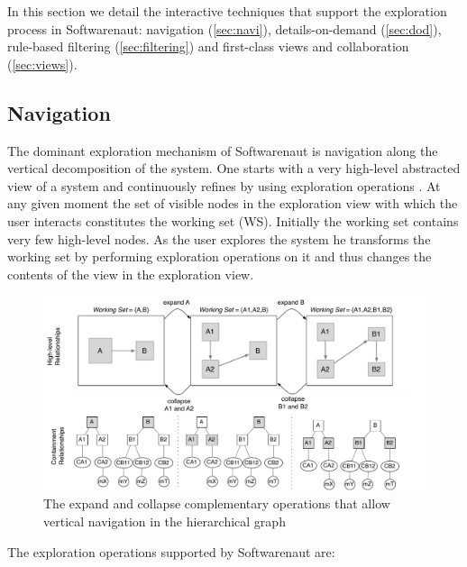 \documentclass[preprint,12pt]{elsarticle}
\begin{document}
In this section we detail the interactive techniques that support the exploration process in Softwarenaut: navigation (\ref{sec:navi}), details-on-demand (\ref{sec:dod}), rule-based filtering (\ref{sec:filtering}) and first-class views and collaboration (\ref{sec:views}).  

\subsection{Navigation} 

The dominant exploration mechanism of Softwarenaut is navigation along the vertical decomposition of the system. One starts with a very high-level abstracted view of a system and continuously refines by using exploration operations \cite{robertson-conetrees}. At any given moment the set of visible nodes in the exploration view with which the user interacts constitutes the working set (WS). Initially the working set contains very few high-level nodes. As the user explores the system he transforms the working set by performing exploration operations on it and thus changes the contents of the view in the exploration view.

\begin{figure}[ht]
\begin{center}
\includegraphics[width=\linewidth]{SnautSequence}
\caption{The expand and collapse complementary operations that allow vertical navigation in the hierarchical graph}
\label{}
\end{center}
\end{figure}

The exploration operations supported by Softwarenaut are:
\end{document}
